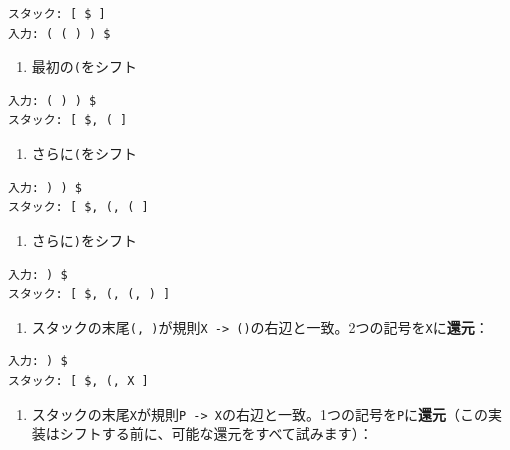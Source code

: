 \begin{verbatim}
スタック: [ $ ]
入力: ( ( ) ) $
\end{verbatim}

\begin{enumerate}
\def\labelenumi{\arabic{enumi}.}
\setcounter{enumi}{1}
\tightlist
\item
  最初の\texttt{(}をシフト
\end{enumerate}

\begin{verbatim}
入力: ( ) ) $
スタック: [ $, ( ]
\end{verbatim}

\begin{enumerate}
\def\labelenumi{\arabic{enumi}.}
\setcounter{enumi}{2}
\tightlist
\item
  さらに\texttt{(}をシフト
\end{enumerate}

\begin{verbatim}
入力: ) ) $
スタック: [ $, (, ( ]
\end{verbatim}

\begin{enumerate}
\def\labelenumi{\arabic{enumi}.}
\setcounter{enumi}{3}
\tightlist
\item
  さらに\texttt{)}をシフト
\end{enumerate}

\begin{verbatim}
入力: ) $
スタック: [ $, (, (, ) ]
\end{verbatim}

\begin{enumerate}
\def\labelenumi{\arabic{enumi}.}
\setcounter{enumi}{4}
\tightlist
\item
  スタックの末尾\texttt{(,\ )}が規則\texttt{X\ -\textgreater{}\ ()}の右辺と一致。2つの記号を\texttt{X}に\textbf{還元}：
\end{enumerate}

\begin{verbatim}
入力: ) $
スタック: [ $, (, X ]
\end{verbatim}

\begin{enumerate}
\def\labelenumi{\arabic{enumi}.}
\setcounter{enumi}{5}
\tightlist
\item
  スタックの末尾\texttt{X}が規則\texttt{P\ -\textgreater{}\ X}の右辺と一致。1つの記号を\texttt{P}に\textbf{還元}（この実装はシフトする前に、可能な還元をすべて試みます）：
\end{enumerate}

